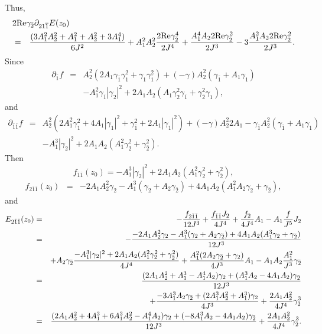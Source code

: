 \documentclass[12pt]{amsart}
\def\1bar{\overline{1}}
\def\d{\partial}
\def\d{\partial}
\begin{document}
Thus,
\begin{eqnarray*}
\lefteqn{2\hbox{Re} \gamma_{\bar2} \d_{2 1 \1bar } E(z_0)}\\
&=&{(3A_1^2A_2^2+A_1^2+A_2^2+3A_1^4) \over 6 J^2} + A_1^2A_2^2{ 2\hbox{Re} \gamma_{\bar2}^4  \over 2 J^4} +{ A_1^4 A_22\hbox{Re} \gamma_{\bar2} ^2\over 2 J^3} 
-3 {A_1^2 A_2 2\hbox{Re} \gamma_{\bar2}^2  \over 2 J^3}.
\end{eqnarray*} 
Since
\begin{eqnarray*}
\d_{\bar1} f
&=&A_2^2 ( 2 A_1 \gamma_{\bar1} \gamma_1^2 +\gamma_1  \gamma_{\bar1}^2)+(-\gamma) A_2^2 (\gamma_{\bar1}+A_1 \gamma_1 )\\
&&- A_1^2 \gamma_{\bar1} |\gamma_2|^2
+2A_1A_2 (A_1 \gamma_2^2 \gamma_{\bar1} + \gamma_{\bar2}^2 \gamma_1),
\end{eqnarray*}
and
\begin{eqnarray*}
\d_{\bar1 \bar1} f
&=&A_2^2 ( 2 A_1^2 \gamma_1^2 +4A_1 |\gamma_1|^2 +\gamma_{\bar1}^2 +2A_1 |\gamma_1 |^2 )
+(-\gamma) A_2^2 2A_1-\gamma_{\bar1} A_2^2(\gamma_{\bar1}+A_1 \gamma_1)\\
&&- A_1^3 |\gamma_2|^2
+2A_1A_2 (A_1^2 \gamma_2^2 + \gamma_{\bar2}^2 ).
\end{eqnarray*}
Then 
$$
f_{\bar1\bar1}(z_0)=-A_1^3|\gamma_2|^2+2A_1A_2(A_1^2 \gamma_2^2+\gamma_{\bar2}^2),
$$
\begin{eqnarray*}
f_{2\bar1\bar1}(z_0)
&=&-2A_1A_2^2 \gamma_2 
- A_1^3 (\gamma_2+A_2\gamma_{\bar2} )
+4A_1A_2 (A_1^2 A_2 \gamma_2 +  \gamma_{\bar2} ),
\end{eqnarray*}
and
\begin{eqnarray*}
E_{2\bar1\bar1}(z_0)
&=&-{f_{2\bar1\bar1}\over 12 J^3}+{f_{\bar1\bar1} J_2\over 4 J^4}+{f_2\over 4J^4} A_1-A_1{f\over J^5} J_2\\
&=&-{-2A_1 A_2^2 \gamma_2 
- A_1^3 ( \gamma_2+A_2\gamma_{\bar2} )
+4A_1A_2 (A_1^3 \gamma_2 + \gamma_{\bar2} ) \over 12 J^3}\\
&&+A_2 \gamma_{\bar2} {-A_1^3|\gamma_2|^2+2A_1A_2(A_1^2 \gamma_2^2+\gamma_{\bar2}^2) \over 4 J^4}+{A_1^2(2A_2\gamma_{\bar2}+\gamma_2)\over 4J^3} A_1-A_1A_2 {A_1^2 \over J^3} \gamma_{\bar2}\\
&=&{(2A_1 A_2^2 
+ A_1^3 -A_1^4A_2)  \gamma_2+(A_1^3 A_2- 4A_1 A_2) \gamma_{\bar2}  \over 12 J^3}\\
&&+  {-3A_1^3 A_2   \gamma_{\bar2} +(2A_1^3 A_2^2  +A_1^3) \gamma_2 \over 4J^3} +{2A_1A_2^2\over 4J^4}  \gamma_{\bar2}^3\\
&=&{(2A_1 A_2^2 
+ 4A_1^3+6A_1^3A_2^2 -A_1^4A_2)  \gamma_2+(-8A_1^3 A_2- 4A_1 A_2) \gamma_{\bar2}  \over 12 J^3}+{2A_1A_2^2\over 4J^4}  \gamma_{\bar2}^3.
\end{eqnarray*}
\end{document}

